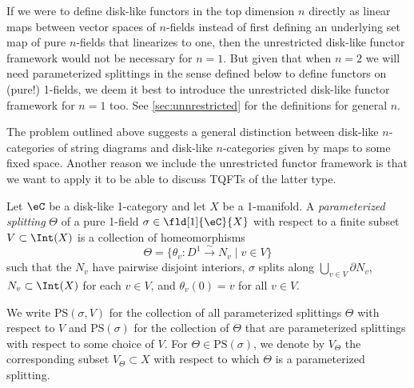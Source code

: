 \documentclass[12pt,reqno]{amsart}
\newcommand{\C}{\eC}
\newcommand{\defn}[1]{\emph{#1}}
\begin{document}
If we were to define disk-like functors in the top dimension $n$ directly as linear maps between vector spaces of $n$-fields instead of first defining an underlying set map of pure $n$-fields that linearizes to one, then the unrestricted disk-like functor framework would not be necessary for $n=1$. But given that when $n=2$ we will need parameterized splittings in the sense defined below to define functors on (pure!) 1-fields, we deem it best to introduce the unrestricted disk-like functor framework for $n=1$ too. See \cref{sec:unnrestricted} for the definitions for general $n$.

The problem outlined above suggests a general distinction between disk-like $n$-categories of string diagrams and disk-like $n$-categories given by maps to some fixed space. Another reason we include the unrestricted functor framework is that we want to apply it to be able to discuss TQFTs of the latter type. 

\begin{definition}
Let $\C$ be a disk-like 1-category and let $X$ be a 1-manifold. A \defn{parameterized splitting} $\Theta$ of a pure 1-field $\sigma\in\fld[1]{\C}{X}$ with respect to a finite subset $V\subset \Int(X)$ is a collection of homeomorphisms
\[
  \Theta=\{\theta_v\colon D^1\overset\sim\to N_v \mid v\in V\}
\]
such that the $N_v$ have pairwise disjoint interiors, $\sigma$ splits along $\bigcup_{v\in V}\partial N_v$, $N_v\subset\Int(X)$ for each $v\in V$, and $\theta_v(0)=v$ for all $v\in V$.

We write $\mathrm{PS}(\sigma,V)$ for the collection of all parameterized splittings $\Theta$ with respect to $V$ and $\mathrm{PS}(\sigma)$ for the collection of $\Theta$ that are parameterized splittings with respect to some choice of $V$. For $\Theta\in\mathrm{PS}(\sigma)$, we denote by $V_\Theta$ the corresponding subset $V_\Theta\subset X$ with respect to which $\Theta$ is a parameterized splitting.
\end{definition}
\end{document}
